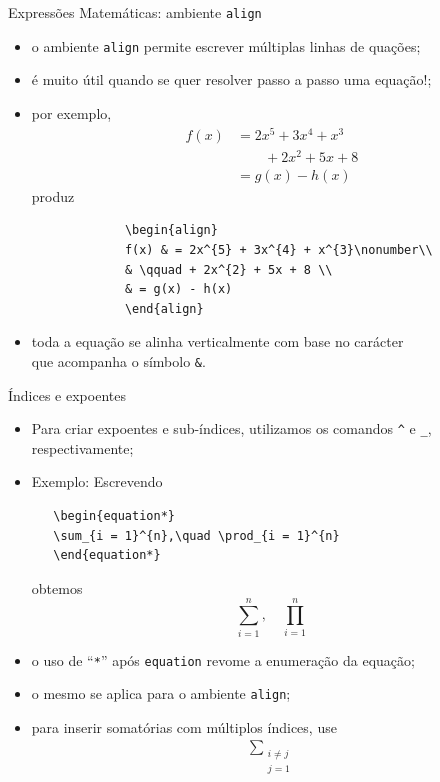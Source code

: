 \documentclass[c]{beamer}
\begin{document}
{\begin{frame}[fragile]{\sc Expressões Matemáticas: ambiente \texttt{align}}
	\begin{itemize}
		\setlength\itemsep{0.3cm}
		\item o ambiente \verb|align| permite escrever {\color{blue} múltiplas} linhas de {\color{blue} quações}; 
		\item é muito útil quando se quer resolver passo a passo uma equação!;
		\item por exemplo,
		     \begin{align}
		     f(x) & = 2x^{5} + 3x^{4} + x^{3}\nonumber\\
		     & \qquad + 2x^{2} + 5x + 8 \\
		     & = g(x) - h(x)
		     \end{align} 
		produz 
		\begin{verbatim}
		     \begin{align}
		     f(x) & = 2x^{5} + 3x^{4} + x^{3}\nonumber\\
		     & \qquad + 2x^{2} + 5x + 8 \\
		     & = g(x) - h(x)
		     \end{align} 
		\end{verbatim}
		\item toda a equação se {\color{blue} alinha verticalmente} com base no carácter\\
	 que acompanha o {\color{blue} símbolo \verb|&|}.
	\end{itemize}
\end{frame}



\begin{frame}[fragile]{\sc Índices e expoentes}
	\begin{itemize}
		\setlength\itemsep{0.2cm}
   \item Para criar {\color{blue} expoentes} e {\color{blue} sub-índices}, 
   utilizamos os comandos \verb|^| e \verb|_|, respectivamente;
   \item Exemplo: Escrevendo \\
   \begin{verbatim}
   \begin{equation*}
   \sum_{i = 1}^{n},\quad \prod_{i = 1}^{n}
   \end{equation*}
   \end{verbatim}
   obtemos
   \begin{equation*}
   \sum_{i = 1}^{n}, \quad  \prod_{i = 1}^{n}
   \end{equation*}
   \item o uso de ``\verb|*|'' após \verb|equation| {\color{blue} revome a enumeração} da equação;
   \item o mesmo se aplica para o ambiente \verb|align|;
   \item para inserir somatórias com múltiplos índices, use 
   \begin{align}
   \sum_{\substack{ i\neq j\\ j=1}}
   \end{align}
	\end{itemize}
\end{frame}



}
\end{document}
